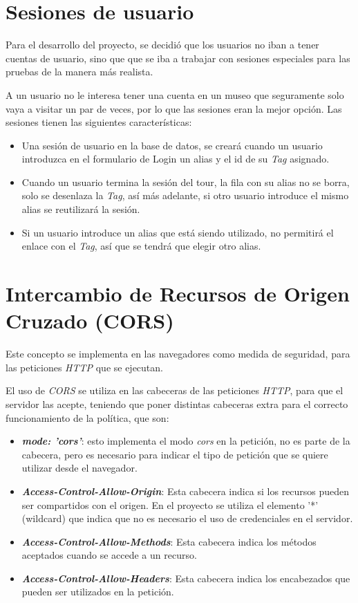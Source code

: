 \section{Sesiones de usuario}
Para el desarrollo del proyecto, se decidió que los usuarios no iban a tener cuentas de usuario, sino que que se iba a trabajar con sesiones especiales para las pruebas  de la manera más realista.

A un usuario no le interesa tener una cuenta en un museo que seguramente solo vaya a visitar un par de veces, por lo que las sesiones eran la mejor opción. Las sesiones tienen las siguientes características:
\begin{itemize}
    \item Una sesión de usuario en la base de datos, se creará cuando un usuario introduzca en el formulario de Login un alias y el id de su \textit{Tag} asignado.
    \item Cuando un usuario termina la sesión del tour, la fila con su alias no se borra, solo se desenlaza la \textit{Tag}, así más adelante, si otro usuario introduce el mismo alias se reutilizará la sesión.
    \item Si un usuario introduce un alias que está siendo utilizado, no permitirá el enlace con el \textit{Tag}, así que se tendrá que elegir otro alias.
\end{itemize}

\section{Intercambio de Recursos de Origen Cruzado (CORS)}
Este concepto se implementa en las navegadores como medida de seguridad, para las peticiones \textit{HTTP} que se ejecutan.\cite{amazon:CORS}

El uso de \textit{CORS} se utiliza en las cabeceras de las peticiones \textit{HTTP}, para que el servidor las acepte, teniendo que poner distintas cabeceras extra para el correcto funcionamiento de la política, que son:

\begin{itemize}
    \item \textit{\textbf{mode: 'cors'}}: esto implementa el modo \textit{cors} en la petición, no es parte de la cabecera, pero es necesario para indicar el tipo de petición que se quiere utilizar desde el navegador.
    \item \textit{\textbf{Access-Control-Allow-Origin}}: Esta cabecera indica si los recursos pueden ser compartidos con el origen. En el proyecto se utiliza el elemento '*' (wildcard) que indica que no es necesario el uso de credenciales en el servidor.
    \item \textit{\textbf{Access-Control-Allow-Methods}}: Esta cabecera indica los métodos aceptados cuando se accede a un recurso.
    \item \textit{\textbf{Access-Control-Allow-Headers}}: Esta cabecera indica los encabezados que pueden ser utilizados en la petición.
\end{itemize}

